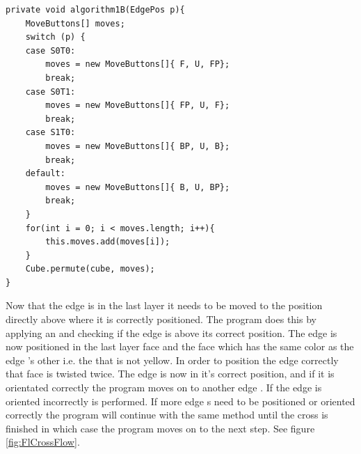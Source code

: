 \begin{lstlisting}[style=sourceCode, caption=\myCaption{This is algorithm 1B, which will move an edge piece from the middle layer to the top layer without ruining any edge pieces which are correctly positioned in the cross.}, label=src:middleMove, float=htb]
private void algorithm1B(EdgePos p){
	MoveButtons[] moves;
	switch (p) {
	case S0T0:
		moves = new MoveButtons[]{ F, U, FP};
		break;
	case S0T1:
		moves = new MoveButtons[]{ FP, U, F};
		break;
	case S1T0:
		moves = new MoveButtons[]{ BP, U, B};
		break;
	default:
		moves = new MoveButtons[]{ B, U, BP};
		break;
	}
	for(int i = 0; i < moves.length; i++){
		this.moves.add(moves[i]);
	}
	Cube.permute(cube, moves);
}
\end{lstlisting}

Now that the edge \cpiece{} is in the last layer it needs to be moved to the position directly above where it is correctly positioned. 
The program does this by applying an  \twist{} and checking if the edge \cpiece{} is above its correct position.
The edge \cpiece{} is now positioned in the last layer face and the face which has the same color as the edge  \cpiece{}'s other \facelet{} i.e. the \facelet{} that is not yellow.
In order to position the edge \cpiece{} correctly that face is twisted twice.
The edge \cpiece{} is now in it's correct position, and if it is orientated correctly the program moves on to another edge \cpiece{} .
If the edge \cpiece{} is oriented incorrectly  is performed. If more edge \cpiece{}s need to be positioned or oriented correctly the program will continue with the same method until the cross is finished in which case the program moves on to the next step. See figure \ref{fig:FlCrossFlow}.

